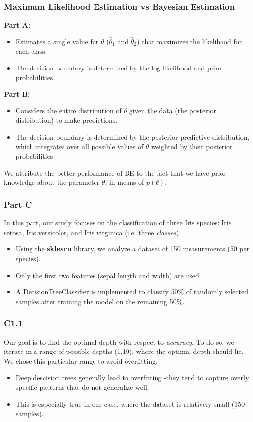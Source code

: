 \documentclass{beamer}
\begin{document}
\begin{frame}
\frametitle{Maximum Likelihood Estimation vs Bayesian Estimation}

\textbf{Part A:}
\begin{itemize}
    \item Estimates a single value for $\theta$ ($\hat{\theta}_1$ and $\hat{\theta}_2$) that maximizes the likelihood for each class.
    \item The decision boundary is determined by the log-likelihood and prior probabilities.
\end{itemize}



\textbf{Part B:}
\begin{itemize}
    \item Considers the entire distribution of $\theta$ given the data (the posterior distribution) to make predictions.
    \item The decision boundary is determined by the posterior predictive distribution,  which integrates over all possible values of $\theta$ weighted by their posterior probabilities.
\end{itemize}

We attribute the better performance of BE to the fact that we have prior knowledge about the parameter $\theta$, in means of $p(\theta)$.

\end{frame}


\begin{frame}
\frametitle{Part C}
In this part, our study focuses on the classification of three Iris species: Iris setosa, Iris versicolor, and Iris virginica (i.e. three \textit{classes}).
\begin{itemize}
    \item Using the \textbf{sklearn} library, we analyze a dataset of 150 measurements (50 per species).
    \item Only the first two features (sepal length and width) are used.
    \item A DecisionTreeClassifier is implemented to classify 50\% of randomly selected samples after training the model on the remaining 50\%.
\end{itemize}
   
\end{frame}

\begin{frame}
\frametitle{C1.1}
Our goal is to find the optimal depth with respect to \textit{accuracy}. To do so, we iterate in a range of possible depths (1,10), where the optimal depth should lie. We chose this particular range to avoid overfitting. 
\begin{itemize}
    \item Deep descision trees generally lead to overfitting -they tend to capture overly specific patterns that do not generalize well.
    \item This is especially true in our case, where the dataset is relatively small (150 samples).
\end{itemize}

\end{frame}
\end{document}
